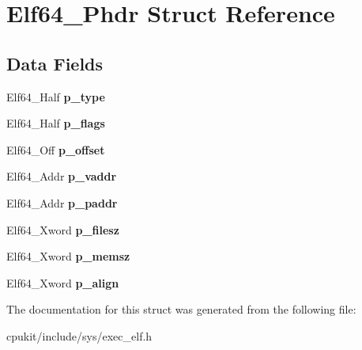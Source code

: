 \hypertarget{structElf64__Phdr}{}\section{Elf64\+\_\+\+Phdr Struct Reference}
\label{structElf64__Phdr}
\subsection*{Data Fields}
\begin{DoxyCompactItemize}
\item 
\mbox{\label{structElf64__Phdr_a5b4cb44f1c556722954c44dad73406dc}} 
Elf64\+\_\+\+Half {\bfseries p\+\_\+type}
\item 
\mbox{\label{structElf64__Phdr_a6aae92d5b7ce9d963a9e3135fb8e952c}} 
Elf64\+\_\+\+Half {\bfseries p\+\_\+flags}
\item 
\mbox{\label{structElf64__Phdr_aa2d51fb4517ded0c74903f8d0c9abea7}} 
Elf64\+\_\+\+Off {\bfseries p\+\_\+offset}
\item 
\mbox{\label{structElf64__Phdr_a5c69879e1229b175020ff011af46fcb9}} 
Elf64\+\_\+\+Addr {\bfseries p\+\_\+vaddr}
\item 
\mbox{\label{structElf64__Phdr_a83f4adb032fc307f5af79bdee5ef692d}} 
Elf64\+\_\+\+Addr {\bfseries p\+\_\+paddr}
\item 
\mbox{\label{structElf64__Phdr_af50e5756da2acda5ccb02ebaa3367092}} 
Elf64\+\_\+\+Xword {\bfseries p\+\_\+filesz}
\item 
\mbox{\label{structElf64__Phdr_a55fae01175fc4e3f1c23e52b14459235}} 
Elf64\+\_\+\+Xword {\bfseries p\+\_\+memsz}
\item 
\mbox{\label{structElf64__Phdr_aa89a4b1835998c8866e821d777a2f879}} 
Elf64\+\_\+\+Xword {\bfseries p\+\_\+align}
\end{DoxyCompactItemize}


The documentation for this struct was generated from the following file\+:\begin{DoxyCompactItemize}
\item 
cpukit/include/sys/exec\+\_\+elf.\+h\end{DoxyCompactItemize}
